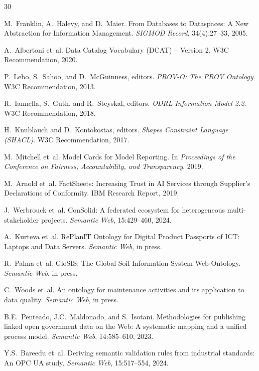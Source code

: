 \documentclass[11pt,a4paper]{article}
\begin{document}

\begin{thebibliography}{30}

 M.~Franklin, A.~Halevy, and D.~Maier. From Databases to Dataspaces: A New Abstraction for Information Management. \emph{SIGMOD Record}, 34(4):27--33, 2005.

 A.~Albertoni et~al. Data Catalog Vocabulary (DCAT) -- Version 2. W3C Recommendation, 2020.

 P.~Lebo, S.~Sahoo, and D.~McGuinness, editors. \emph{PROV-O: The PROV Ontology}. W3C Recommendation, 2013.

 R.~Iannella, S.~Guth, and R.~Steyskal, editors. \emph{ODRL Information Model 2.2}. W3C Recommendation, 2018.

 H.~Knublauch and D.~Kontokostas, editors. \emph{Shapes Constraint Language (SHACL)}. W3C Recommendation, 2017.

 M.~Mitchell et~al. Model Cards for Model Reporting. In \emph{Proceedings of the Conference on Fairness, Accountability, and Transparency}, 2019.

 M.~Arnold et~al. FactSheets: Increasing Trust in AI Services through Supplier's Declarations of Conformity. IBM Research Report, 2019.

 J.~Werbrouck et~al. ConSolid: A federated ecosystem for heterogeneous multi-stakeholder projects. \emph{Semantic Web}, 15:429--460, 2024.

 A.~Kurteva et~al. RePlanIT Ontology for Digital Product Passports of ICT: Laptops and Data Servers. \emph{Semantic Web}, in press.

 R.~Palma et~al. GloSIS: The Global Soil Information System Web Ontology. \emph{Semantic Web}, in press.

 C.~Woods et~al. An ontology for maintenance activities and its application to data quality. \emph{Semantic Web}, in press.

 B.E.~Penteado, J.C.~Maldonado, and S.~Isotani. Methodologies for publishing linked open government data on the Web: A systematic mapping and a unified process model. \emph{Semantic Web}, 14:585--610, 2023.

 Y.S.~Bareedu et~al. Deriving semantic validation rules from industrial standards: An OPC UA study. \emph{Semantic Web}, 15:517--554, 2024.


\end{thebibliography}
\end{document}
